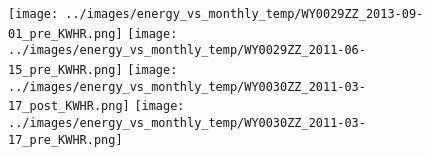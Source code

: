 \clearpage
\begin{figure}
\centering
\texttt{[image: ../images/energy\_vs\_monthly\_temp/WY0029ZZ\_2013-09-01\_pre\_KWHR.png]}
\texttt{[image: ../images/energy\_vs\_monthly\_temp/WY0029ZZ\_2011-06-15\_pre\_KWHR.png]}
\texttt{[image: ../images/energy\_vs\_monthly\_temp/WY0030ZZ\_2011-03-17\_post\_KWHR.png]}
\texttt{[image: ../images/energy\_vs\_monthly\_temp/WY0030ZZ\_2011-03-17\_pre\_KWHR.png]}
\end{figure}
\clearpage
